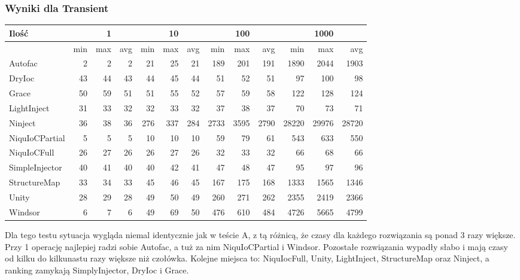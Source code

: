 \documentclass[12pt]{article}
\begin{document}
\subsubsection{Wyniki dla Transient}
\begin{center}
\begin{small}
	\begin{tabular}{ | l | r r r | r r r | r r r | r r r | }
    		\hline
Ilość & & 1 & & & 10 & & & 100 & & & 1000 & \\ \hline
 & min & max & avg & min & max & avg & min & max & avg & min & max & avg \\ \hline
Autofac & 2 & 2 & 2 & 21 & 25 & 21 & 189 & 201 & 191 & 1890 & 2044 & 1903 \\ \hline
DryIoc & 43 & 44 & 43 & 44 & 45 & 44 & 51 & 52 & 51 & 97 & 100 & 98 \\ \hline
Grace & 50 & 59 & 51 & 51 & 55 & 52 & 57 & 59 & 58 & 122 & 128 & 124 \\ \hline
LightInject & 31 & 33 & 32 & 32 & 33 & 32 & 37 & 38 & 37 & 70 & 73 & 71 \\ \hline
Ninject & 36 & 38 & 36 & 276 & 337 & 284 & 2733 & 3595 & 2790 & 28220 & 29976 & 28720 \\ \hline
NiquIoCPartial & 5 & 5 & 5 & 10 & 10 & 10 & 59 & 79 & 61 & 543 & 633 & 550 \\ \hline
NiquIoCFull & 26 & 27 & 26 & 26 & 27 & 26 & 32 & 33 & 32 & 66 & 68 & 66 \\ \hline
SimpleInjector & 40 & 41 & 40 & 40 & 42 & 41 & 47 & 48 & 47 & 95 & 97 & 96 \\ \hline
StructureMap & 33 & 34 & 33 & 45 & 46 & 45 & 167 & 175 & 168 & 1333 & 1565 & 1346 \\ \hline
Unity & 28 & 29 & 28 & 49 & 50 & 49 & 260 & 271 & 262 & 2355 & 2419 & 2366 \\ \hline
Windsor & 6 & 7 & 6 & 49 & 69 & 50 & 476 & 610 & 484 & 4726 & 5665 & 4799 \\ \hline
  	\end{tabular}
\end{small}
\end{center}
Dla tego testu sytuacja wygląda niemal identycznie jak w teście A, z tą różnicą, że czasy dla każdego rozwiązania są ponad 3 razy większe.\\
Przy 1 operację najlepiej radzi sobie Autofac, a tuż za nim NiquIoCPartial i Windsor. Pozostałe rozwiązania wypadły słabo i mają czasy od kilku do kilkunastu razy większe niż czołówka. Kolejne miejsca to: NiquIocFull, Unity, LightInject, StructureMap oraz Ninject, a ranking zamykają SimplyInjector, DryIoc i Grace.\\
\end{document}
